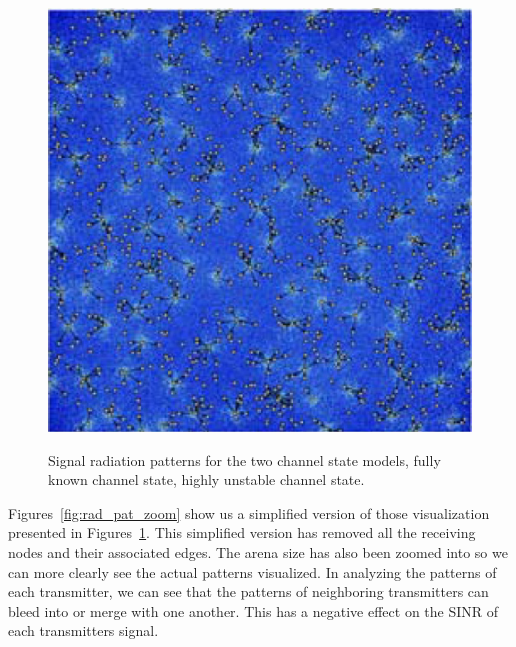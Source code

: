 \begin{figure} [ht]
{		\includegraphics[scale=0.45]{images/network_vis/rad_pat_uncertain.eps}
		\label{fig:rad_pat_uncertain}
	}
\caption{Signal radiation patterns for the two channel state models,  fully known channel state,  highly unstable channel state.}
\label{fig:rad_pat}
\end{figure}

Figures~\ref{fig:rad_pat_zoom} show us a simplified version of those visualization presented in Figures~\ref{fig:rad_pat}.  This simplified version has removed all the receiving nodes and their associated edges.  The arena size has also been zoomed into so we can more clearly see the actual patterns visualized.  In analyzing the patterns of each transmitter, we can see that the patterns of neighboring transmitters can bleed into or merge with one another.  This has a negative effect on the SINR of each transmitters signal.

